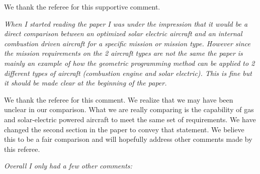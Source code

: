 \documentclass[10pt, a4paper]{article}
\begin{document}
    We thank the referee for this supportive comment. 

\emph{When I started reading the paper I was under the impression that it would be a direct comparison between an optimized solar electric aircraft and an internal combustion driven aircraft for a specific mission or mission type. However since the mission requirements on the 2 aircraft types are not the same the paper is mainly an example of how the geometric programming method can be applied to 2 different types of aircraft (combustion engine and solar electric). This is fine but it should be made clear at the beginning of the paper.}

    We thank the referee for this comment.  We realize that we may have been unclear in our comparison.  What we are really comparing is the capability of gas and solar-electric powered aircraft to meet the same set of requirements.  We have changed the second section in the paper to convey that statement.  We believe this to be a fair comparison and will hopefully address other comments made by this referee. 

\emph{Overall I only had a few other comments:}
\end{document}
